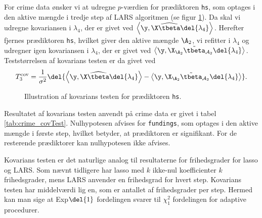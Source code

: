 For crime data ønsker vi at udregne \(p\)-værdien for prædiktoren \texttt{hs}, som optages i den aktive mængde i tredje step af LARS algoritmen (se figur \ref{fig:crime_covTest}). 
Da skal vi udregne kovariansen i \(\lambda_4\), der er givet ved \(\left\langle \y, \X \widehat{\tbeta} \del{\lambda_4} \right\rangle\).
Herefter fjernes prædiktoren \texttt{hs}, hvilket giver den aktive mængde \(\A_{2}\), vi refitter i \(\lambda_4\) og udregner igen kovariansen i \(\lambda_4\), der er givet ved \(\left\langle  \y, \X_{\A_{2}} \tilde{\tbeta}_{\mathcal{A}_{2}} \del{\lambda_{4}} \right\rangle\).
Teststørrelsen af kovarians testen er da givet ved
\begin{align*}
T_3^\text{cov} = \frac{1}{\sigma^2} \del{ \left\langle \y, \X \widehat{\tbeta} \del{\lambda_{4}} \right\rangle - \left\langle  \y, \X_{\A_{2}} \tilde{\tbeta}_{\mathcal{A}_{2}} \del{\lambda_{4}} \right\rangle}.
\end{align*}
%
\begin{figure}[H]
\centering
{}
\caption{Illustration af kovarians testen for prædiktoren \texttt{hs}.} \label{fig:crime_covTest}
\end{figure}
%
Resultatet af kovarians testen anvendt på crime data er givet i tabel \ref{tab:crime_covTest}.
Nulhypotesen afvises for \texttt{fundings}, som optages i den aktive mængde i første step, hvilket betyder, at prædiktoren er signifikant.
For de resterende prædiktorer kan nulhypotesen ikke afvises.
%


Kovarians testen er det naturlige analog til resultaterne for frihedsgrader for lasso og LARS.
Som nævnt tidligere har lasso med \(k\) ikke-nul koefficienter \(k\) frihedsgrader, mens LARS anvender en frihedsgrad for hvert step.
Kovarians testen har middelværdi lig en, som er antallet af frihedsgrader per step.
Hermed kan man sige at Exp\(\del{1}\) fordelingen svarer til \(\chi_1^2\) fordelingen for adaptive procedurer.

